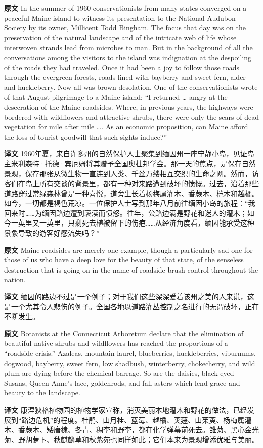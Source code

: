 \documentclass[UTF8,zihao=-4]{ctexart}
\begin{document}
\noindent\textbf{原文} In the summer of 1960 conservationists from many states converged on a peaceful Maine island to witness its presentation to the National Audubon Society by its owner, Millicent Todd Bingham. The focus that day was on the preservation of the natural landscape and of the intricate web of life whose interwoven strands lead from microbes to man. But in the background of all the conversations among the visitors to the island was indignation at the despoiling of the roads they had traveled. Once it had been a joy to follow those roads through the evergreen forests, roads lined with bayberry and sweet fern, alder and huckleberry. Now all was brown desolation. One of the conservationists wrote of that August pilgrimage to a Maine island: ``I returned \ldots{} angry at the desecration of the Maine roadsides. Where, in previous years, the highways were bordered with wildflowers and attractive shrubs, there were only the scars of dead vegetation for mile after mile \ldots{}. As an economic proposition, can Maine afford the loss of tourist goodwill that such sights induce?''
\par
\noindent\textbf{译文} 1960年夏，来自许多州的自然保护人士聚集到缅因州一座宁静小岛，见证岛主米利森特·托德·宾厄姆将其赠予全国奥杜邦学会。那一天的焦点，是保存自然景观，保存那张从微生物一直连到人类、千丝万缕相互交织的生命之网。然而，访客们在岛上所有交谈的背景里，都有一种对来路遭到破坏的愤慨。过去，沿着那些道路穿过常绿森林曾是一种喜悦，道旁生长着杨梅属灌木、香蕨木、桤木和越橘。如今，一切都是褐色荒凉。一位保护人士写到那年八月前往缅因小岛的旅程：“我回来时……为缅因路边遭到亵渎而愤怒。往年，公路边满是野花和迷人的灌木；如今一英里又一英里，只剩死去植被留下的伤疤……从经济角度看，缅因能承受这种景象导致的游客好感流失吗？”
\par\medskip

\noindent\textbf{原文} Maine roadsides are merely one example, though a particularly sad one for those of us who have a deep love for the beauty of that state, of the senseless destruction that is going on in the name of roadside brush control throughout the nation.
\par
\noindent\textbf{译文} 缅因的路边不过是一个例子；对于我们这些深深爱着该州之美的人来说，这是一个尤其令人悲伤的例子。全国各地以道路灌丛控制之名进行的无谓破坏，正在不断发生。
\par\medskip

\noindent\textbf{原文} Botanists at the Connecticut Arboretum declare that the elimination of beautiful native shrubs and wildflowers has reached the proportions of a ``roadside crisis.'' Azaleas, mountain laurel, blueberries, huckleberries, viburnums, dogwood, bayberry, sweet fern, low shadbush, winterberry, chokecherry, and wild plum are dying before the chemical barrage. So are the daisies, black-eyed Susans, Queen Anne's lace, goldenrods, and fall asters which lend grace and beauty to the landscape.
\par
\noindent\textbf{译文} 康涅狄格植物园的植物学家宣称，消灭美丽本地灌木和野花的做法，已经发展到“路边危机”的程度。杜鹃、山月桂、蓝莓、越橘、荚蒾、山茱萸、杨梅属灌木、香蕨木、矮唐棣、冬青、稠李和野李，都在化学弹幕前死去。雏菊、黑心金光菊、野胡萝卜、秋麒麟草和秋紫苑也同样如此；它们本来为景观增添优雅与美丽。
\par\medskip
\end{document}
